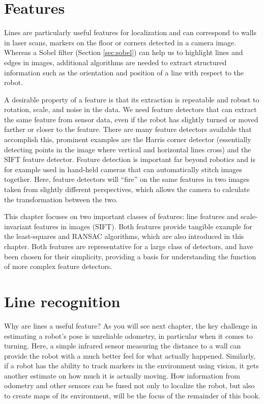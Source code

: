 \section{Features}
Lines are particularly useful features for localization and can correspond to walls in laser scans, markers on the floor or corners detected in a camera image. Whereas a Sobel filter (Section \ref{sec:sobel}) can help us to highlight lines and edges in images, additional algorithms are needed to extract structured information such as the orientation and position of a line with respect to the robot.

A desirable property of a feature is that its extraction is repeatable and robust to rotation, scale, and noise in the data. We need feature detectors that can extract the same feature from sensor data, even if the robot has slightly turned or moved farther or closer to the feature. There are many feature detectors available that accomplish this, prominent examples are the Harris corner detector (essentially detecting points in the image where vertical and horizontal lines cross) and the SIFT feature detector. Feature detection is important far beyond robotics and is for example used in hand-held cameras that can automatically stitch images together. Here, feature detectors will ``fire'' on the same features in two images taken from slightly different perspectives, which allows the camera to calculate the transformation between the two. 

This chapter focuses on two important classes of features: line features and scale-invariant features in images (SIFT). Both features provide tangible example for the least-squares and RANSAC algorithms, which are also introduced in this chapter. Both features are representative for a large class of detectors, and have been chosen for their simplicity, providing a basis for understanding the function of more complex feature detectors. 

\section{Line recognition}
Why are lines a useful feature? As you will see next chapter, the key challenge in estimating a robot's pose is unreliable odometry, in particular when it comes to turning. Here, a simple infrared sensor measuring the distance to a wall can provide the robot with a much better feel for what actually happened. Similarly, if a robot has the ability to track markers in the environment using vision, it gets another estimate on how much it is actually moving. How information from odometry and other sensors can be fused not only to localize the robot, but also to create maps of its environment, will be the focus of the remainder of this book.

